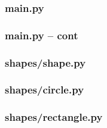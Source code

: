 \documentclass{beamer}
\begin{document}
\begin{frame}
\frametitle{main.py}

\end{frame}

\begin{frame}
\frametitle{main.py -- cont}

\end{frame}

\begin{frame}
\frametitle{shapes/shape.py}

\end{frame}

\begin{frame}
\frametitle{shapes/circle.py}

\end{frame}

\begin{frame}
\frametitle{shapes/rectangle.py}

\end{frame}
\end{document}
